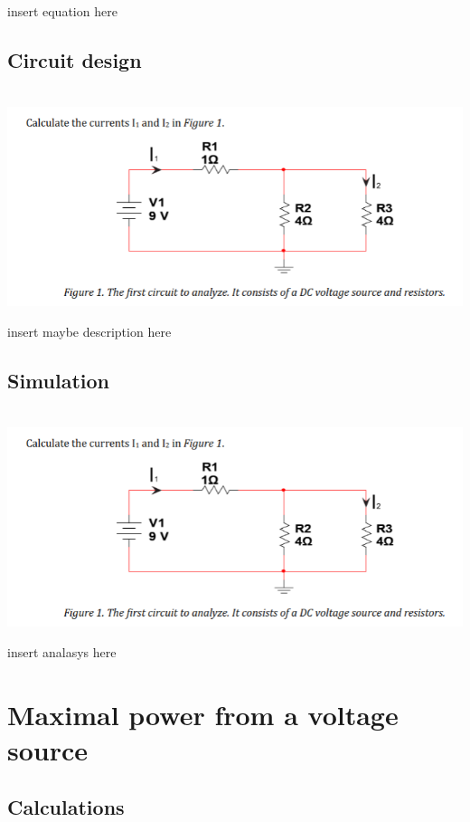 \documentclass[11pt]{article}
\begin{document}
\noindent
insert equation here

\subsection[25pt]{\bf{Circuit design}}

\noindent
\\
\includegraphics[width=\linewidth]{1.1 calculation.png}

insert maybe description here

\subsection[25pt]{\bf{Simulation}}

\noindent
\\
\includegraphics[width=\linewidth]{1.1 calculation.png}

insert analasys here


\section{\bf{Maximal power from a voltage source}}

\subsection[25pt]{\bf{Calculations}}
\end{document}
